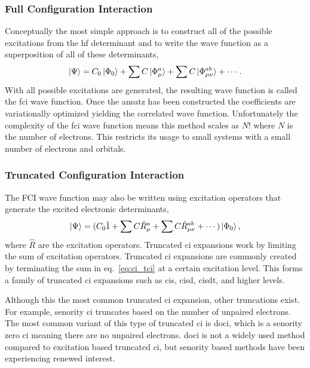 \subsubsection{Full Configuration Interaction}
Conceptually the most simple approach is to construct all of the possible excitations from the \gls{hf} determinant and to write the wave function as a superposition of all of these determinants,
\begin{equation}
\ket{\Psi} = C_0 \ket{\Phi_0} + \sum C \ket{\Phi_{\mu}^{a}} + \sum C \ket{\Phi_{\mu\nu}^{ab}} + \cdots.
\end{equation}
With all possible excitations are generated, the resulting wave function is called the \gls{fci} wave function.
Once the ansatz has been constructed the coefficients are variationally optimized yielding the correlated wave function.
Unfortunately the complexity of the \gls{fci} wave function means this method scales as $N!$ where $N$ is the number of electrons.
This restricts its usage to small systems with a small number of electrons and orbitals.

\subsubsection{Truncated Configuration Interaction}
The FCI wave function may also be written using excitation operators that generate the excited electronic determinants,
\begin{equation}
    \ket{\Psi} = (C_0 \hat{1} + \sum C \hat{R}_{\mu}^{a} + \sum C \hat{R}_{\mu\nu}^{ab} + \cdots )\ket{\Phi_0},
    \label{eq:ci_tci}
\end{equation}
where $\hat{R}$ are the excitation operators.
Truncated \gls{ci} expansions work by limiting the sum of excitation operators.
Truncated \gls{ci} expansions are commonly created by terminating the sum in eq.~\ref{eq:ci_tci} at a certain excitation level.
This forms a family of truncated \gls{ci} expansions such as \gls{cis}, \gls{cisd}, \gls{cisdt}, and higher levels.

Although this the most common truncated \gls{ci} expansion, other truncations exist.
For example, senority \gls{ci} truncates based on the number of unpaired electrons.
The most common variant of this type of truncated \gls{ci} is \gls{doci}, which is a senority zero \gls{ci} meaning there are no unpaired electrons.\cite{10.1021/j100818a001, 10.1063/1.1701519, 10.1063/1.1841109, 10.1021/jp963953l,10.1021/jp963953l}
\gls{doci} is not a widely used method compared to excitation based truncated \gls{ci}, but senority based methods have been experiencing renewed interest.\cite{10.1021/jp963953l,10.1063/1.5130660,10.1063/1.4904384,10.1021/ct300902c,10.1080/00268976.2013.874600,10.1021/jp502127v,10.1021/jp502127v,10.1063/1.4880819,10.1021/acs.jpclett.2c00730}

